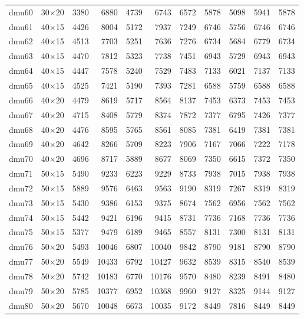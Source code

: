 {\begin{longtable}{lrrrrrrrrrr}
dmu60 & 30$\times$20 & 3380 & 6880 & 4739 & 6743 & 6572 & 5878 & 5098 & 5941 & 5878 \\
dmu61 & 40$\times$15 & 4426 & 8004 & 5172 & 7937 & 7249 & 6746 & 5756 & 6746 & 6746 \\
dmu62 & 40$\times$15 & 4513 & 7703 & 5251 & 7636 & 7276 & 6734 & 5684 & 6779 & 6734 \\
dmu63 & 40$\times$15 & 4470 & 7812 & 5323 & 7738 & 7451 & 6943 & 5729 & 6943 & 6943 \\
dmu64 & 40$\times$15 & 4447 & 7578 & 5240 & 7529 & 7483 & 7133 & 6021 & 7137 & 7133 \\
dmu65 & 40$\times$15 & 4525 & 7421 & 5190 & 7393 & 7281 & 6588 & 5759 & 6588 & 6588 \\
dmu66 & 40$\times$20 & 4479 & 8619 & 5717 & 8564 & 8137 & 7453 & 6373 & 7453 & 7453 \\
dmu67 & 40$\times$20 & 4715 & 8408 & 5779 & 8374 & 7872 & 7377 & 6795 & 7426 & 7377 \\
dmu68 & 40$\times$20 & 4476 & 8595 & 5765 & 8561 & 8085 & 7381 & 6419 & 7381 & 7381 \\
dmu69 & 40$\times$20 & 4642 & 8266 & 5709 & 8223 & 7906 & 7167 & 7066 & 7222 & 7178 \\
dmu70 & 40$\times$20 & 4696 & 8717 & 5889 & 8677 & 8069 & 7350 & 6615 & 7372 & 7350 \\
dmu71 & 50$\times$15 & 5490 & 9233 & 6223 & 9229 & 8733 & 7938 & 7015 & 7938 & 7938 \\
dmu72 & 50$\times$15 & 5889 & 9576 & 6463 & 9563 & 9190 & 8319 & 7267 & 8319 & 8319 \\
dmu73 & 50$\times$15 & 5430 & 9386 & 6153 & 9375 & 8674 & 7562 & 6956 & 7562 & 7562 \\
dmu74 & 50$\times$15 & 5442 & 9421 & 6196 & 9415 & 8731 & 7736 & 7168 & 7736 & 7736 \\
dmu75 & 50$\times$15 & 5377 & 9479 & 6189 & 9465 & 8557 & 8131 & 7300 & 8131 & 8131 \\
dmu76 & 50$\times$20 & 5493 & 10046 & 6807 & 10040 & 9842 & 8790 & 9181 & 8790 & 8790 \\
dmu77 & 50$\times$20 & 5549 & 10433 & 6792 & 10427 & 9632 & 8539 & 8315 & 8540 & 8539 \\
dmu78 & 50$\times$20 & 5742 & 10183 & 6770 & 10176 & 9570 & 8480 & 8239 & 8491 & 8480 \\
dmu79 & 50$\times$20 & 5785 & 10377 & 6952 & 10368 & 9960 & 9127 & 8325 & 9144 & 9127 \\
dmu80 & 50$\times$20 & 5670 & 10048 & 6673 & 10035 & 9172 & 8449 & 7816 & 8449 & 8449 \\
\end{longtable}
}
